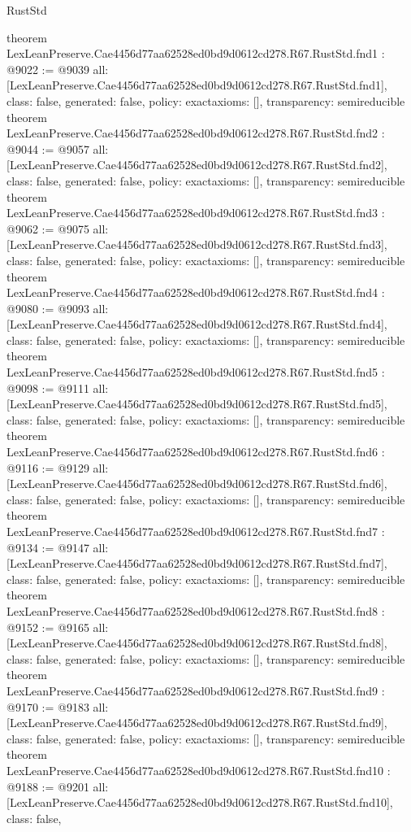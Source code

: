 \begin{lexlean}{RustStd}
\begin{coremodule}
{}
theorem LexLeanPreserve.Cae4456d77aa62528ed0bd9d0612cd278.R67.RustStd.fnd1 : @9022 := @9039 {
  all: [LexLeanPreserve.Cae4456d77aa62528ed0bd9d0612cd278.R67.RustStd.fnd1],
  class: false,
  generated: false,
  policy: exact{axioms: []},
  transparency: semireducible
}
theorem LexLeanPreserve.Cae4456d77aa62528ed0bd9d0612cd278.R67.RustStd.fnd2 : @9044 := @9057 {
  all: [LexLeanPreserve.Cae4456d77aa62528ed0bd9d0612cd278.R67.RustStd.fnd2],
  class: false,
  generated: false,
  policy: exact{axioms: []},
  transparency: semireducible
}
theorem LexLeanPreserve.Cae4456d77aa62528ed0bd9d0612cd278.R67.RustStd.fnd3 : @9062 := @9075 {
  all: [LexLeanPreserve.Cae4456d77aa62528ed0bd9d0612cd278.R67.RustStd.fnd3],
  class: false,
  generated: false,
  policy: exact{axioms: []},
  transparency: semireducible
}
theorem LexLeanPreserve.Cae4456d77aa62528ed0bd9d0612cd278.R67.RustStd.fnd4 : @9080 := @9093 {
  all: [LexLeanPreserve.Cae4456d77aa62528ed0bd9d0612cd278.R67.RustStd.fnd4],
  class: false,
  generated: false,
  policy: exact{axioms: []},
  transparency: semireducible
}
theorem LexLeanPreserve.Cae4456d77aa62528ed0bd9d0612cd278.R67.RustStd.fnd5 : @9098 := @9111 {
  all: [LexLeanPreserve.Cae4456d77aa62528ed0bd9d0612cd278.R67.RustStd.fnd5],
  class: false,
  generated: false,
  policy: exact{axioms: []},
  transparency: semireducible
}
theorem LexLeanPreserve.Cae4456d77aa62528ed0bd9d0612cd278.R67.RustStd.fnd6 : @9116 := @9129 {
  all: [LexLeanPreserve.Cae4456d77aa62528ed0bd9d0612cd278.R67.RustStd.fnd6],
  class: false,
  generated: false,
  policy: exact{axioms: []},
  transparency: semireducible
}
theorem LexLeanPreserve.Cae4456d77aa62528ed0bd9d0612cd278.R67.RustStd.fnd7 : @9134 := @9147 {
  all: [LexLeanPreserve.Cae4456d77aa62528ed0bd9d0612cd278.R67.RustStd.fnd7],
  class: false,
  generated: false,
  policy: exact{axioms: []},
  transparency: semireducible
}
theorem LexLeanPreserve.Cae4456d77aa62528ed0bd9d0612cd278.R67.RustStd.fnd8 : @9152 := @9165 {
  all: [LexLeanPreserve.Cae4456d77aa62528ed0bd9d0612cd278.R67.RustStd.fnd8],
  class: false,
  generated: false,
  policy: exact{axioms: []},
  transparency: semireducible
}
theorem LexLeanPreserve.Cae4456d77aa62528ed0bd9d0612cd278.R67.RustStd.fnd9 : @9170 := @9183 {
  all: [LexLeanPreserve.Cae4456d77aa62528ed0bd9d0612cd278.R67.RustStd.fnd9],
  class: false,
  generated: false,
  policy: exact{axioms: []},
  transparency: semireducible
}
theorem LexLeanPreserve.Cae4456d77aa62528ed0bd9d0612cd278.R67.RustStd.fnd10 : @9188 := @9201 {
  all: [LexLeanPreserve.Cae4456d77aa62528ed0bd9d0612cd278.R67.RustStd.fnd10],
  class: false,
}
\end{coremodule}
\end{lexlean}
